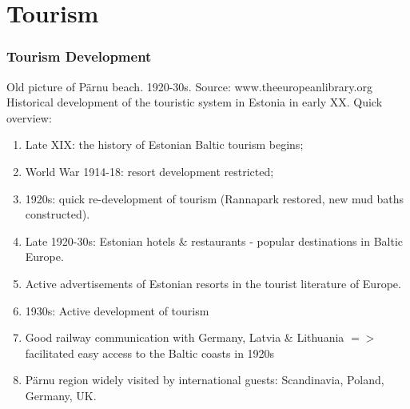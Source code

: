 \documentclass[pdflatex,compress,8pt,
	xcolor={dvipsnames,dvipsnames,svgnames,x11names,table},
	hyperref={	
	breaklinks = true, 
	pdfauthor={Lemenkova Polina}, 
	pdfsubject={Preentation}, 
	pdfcreator={Lemenkova Polina}, 
	pdfproducer={Lemenkova Polina}, 
	colorlinks=true,
	linkcolor=Tomato, 
	citecolor=DeepPink3, 
	urlcolor = NavyBlue, 
	breaklinks = true}]{beamer}
\begin{document}
\section{Tourism}
\begin{frame}\frametitle{Tourism Development}
\vspace{3em}

\begin{figure}[H]
	\centering
			\hspace{1mm}
\end{figure}
Old picture of Pärnu beach. 1920-30s. Source: www.theeuropeanlibrary.org\\
Historical development of the touristic system in Estonia in early XX. Quick overview:
\begin{enumerate}
	\item Late XIX: the history of Estonian Baltic tourism begins;
	\item {} World War 1914-18: resort development restricted;
	\item 1920s: quick re-development of tourism (Rannapark restored, new mud baths constructed).
	\item Late 1920-30s: Estonian hotels \& restaurants - popular destinations in Baltic Europe.
	\item Active advertisements of Estonian resorts in the tourist literature of Europe.
	\item 1930s: Active development of tourism
	\item  Good railway communication with Germany, Latvia \& Lithuania $=>$ facilitated easy access to the Baltic coasts in 1920s
	\item Pärnu region widely visited by international guests: Scandinavia, Poland, Germany, UK.
\end{enumerate}
\end{frame} 
\end{document}
